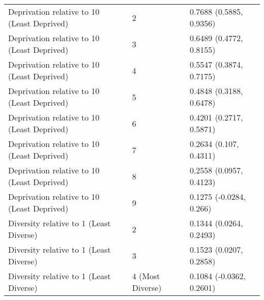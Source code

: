 \begin{table}[ht]
\begin{tabular}{lll}
  Deprivation relative to 10 (Least Deprived) & 2 & 0.7688 (0.5885, 0.9356) \\ 
  Deprivation relative to 10 (Least Deprived) & 3 & 0.6489 (0.4772, 0.8155) \\ 
  Deprivation relative to 10 (Least Deprived) & 4 & 0.5547 (0.3874, 0.7175) \\ 
  Deprivation relative to 10 (Least Deprived) & 5 & 0.4848 (0.3188, 0.6478) \\ 
  Deprivation relative to 10 (Least Deprived) & 6 & 0.4201 (0.2717, 0.5871) \\ 
  Deprivation relative to 10 (Least Deprived) & 7 & 0.2634 (0.107, 0.4311) \\ 
  Deprivation relative to 10 (Least Deprived) & 8 & 0.2558 (0.0957, 0.4123) \\ 
  Deprivation relative to 10 (Least Deprived) & 9 & 0.1275 (-0.0284, 0.266) \\ 
  Diversity relative to 1 (Least Diverse) & 2 & 0.1344 (0.0264, 0.2493) \\ 
  Diversity relative to 1 (Least Diverse) & 3 & 0.1523 (0.0207, 0.2858) \\ 
  Diversity relative to 1 (Least Diverse) & 4 (Most Diverse) & 0.1084 (-0.0362, 0.2601) \\ 
   \hline
\end{tabular}
\end{table}
